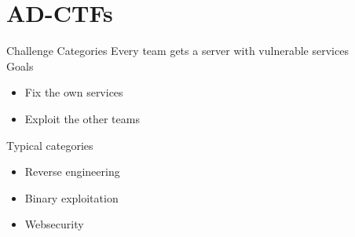\documentclass[12pt]{beamer}
\begin{document}
\section{AD-CTFs}
\begin{frame}{Challenge Categories}
    Every team gets a server with vulnerable services \\
    Goals
    \begin{itemize}
        \item Fix the own services
        \item Exploit the other teams
    \end{itemize}

    Typical categories
    \begin{itemize}
        \item Reverse engineering
        \item Binary exploitation
        \item Websecurity
    \end{itemize}
\end{frame}
\end{document}
